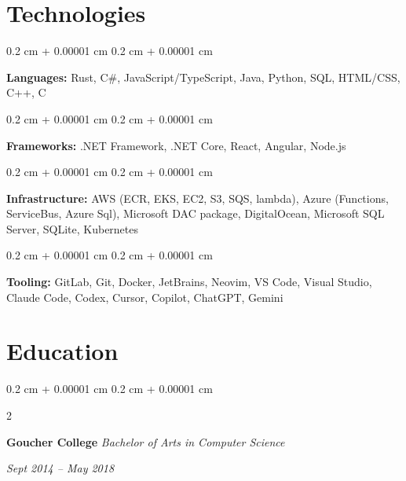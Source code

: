 \documentclass[10pt, letterpaper]{article}
\newenvironment{onecolentry}{
    \begin{adjustwidth}{
            0.2 cm + 0.00001 cm
        }{
            0.2 cm + 0.00001 cm
        }
    }{
    \end{adjustwidth}
} %
\newenvironment{twocolentry}[2][]{
    \onecolentry
    \def\secondColumn{#2}
    \setcolumnwidth{\fill, 10.5 cm}
    \begin{paracol}{2}
    }{
        \switchcolumn \raggedleft \secondColumn
    \end{paracol}
    \endonecolentry
} %
\begin{document}
\section{Technologies}
\begin{onecolentry}
    \textbf{Languages:} Rust, C\#, JavaScript/TypeScript, Java, Python, SQL, HTML/CSS, C++, C
\end{onecolentry}
\vspace{0.2 cm}
\begin{onecolentry}
    \textbf{Frameworks:} .NET Framework, .NET Core, React, Angular, Node.js
\end{onecolentry}
\vspace{0.2 cm}
\begin{onecolentry}
    \textbf{Infrastructure:} AWS (ECR, EKS, EC2, S3, SQS, lambda), Azure (Functions, ServiceBus, Azure Sql), Microsoft DAC package, DigitalOcean, Microsoft SQL Server, SQLite, Kubernetes
\end{onecolentry}
\vspace{0.2 cm}
\begin{onecolentry}
    \textbf{Tooling:} GitLab, Git, Docker, JetBrains, Neovim, VS Code, Visual Studio, Claude Code, Codex, Cursor, Copilot, ChatGPT, Gemini
\end{onecolentry}
\section{Education}
\begin{twocolentry}{
    \textit{Sept 2014 – May 2018}}
    \textbf{Goucher College}
    \newline
    \textit{Bachelor of Arts in Computer Science}
\end{twocolentry}
\end{document}
